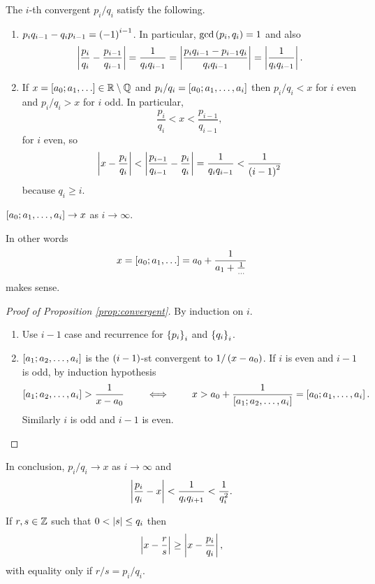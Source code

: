 \begin{proposition}
\label{prop:convergent}
The $ i $-th convergent $ p_i / q_i $ satisfy the following.
\begin{enumerate}
\item $ p_iq_{i - 1} - q_ip_{i - 1} = \rb{-1}^{i - 1} $. In particular, $ \gcd\rb{p_i, q_i} = 1 $ and also
$$ \abs{\dfrac{p_i}{q_i} - \dfrac{p_{i - 1}}{q_{i - 1}}} = \dfrac{1}{q_iq_{i - 1}} = \abs{\dfrac{p_iq_{i - 1} - p_{i - 1}q_i}{q_iq_{i - 1}}} = \abs{\dfrac{1}{q_iq_{i - 1}}}. $$
\item If $ x = \sb{a_0; a_1, \dots} \in \R \setminus \Q $ and $ p_i / q_i = \sb{a_0; a_1, \dots, a_i} $ then $ p_i / q_i < x $ for $ i $ even and $ p_i / q_i > x $ for $ i $ odd. In particular,
$$ \dfrac{p_i}{q_i} < x < \dfrac{p_{i - 1}}{q_{i - 1}}, $$
for $ i $ even, so
$$ \abs{x - \dfrac{p_i}{q_i}} < \abs{\dfrac{p_{i - 1}}{q_{i - 1}} - \dfrac{p_i}{q_i}} = \dfrac{1}{q_iq_{i - 1}} < \dfrac{1}{\rb{i - 1}^2} $$
because $ q_i \ge i $.
\end{enumerate}
\end{proposition}

\pagebreak

\begin{corollary}
$ \sb{a_0; a_1, \dots, a_i} \to x $ as $ i \to \infty $.
\end{corollary}

In other words
$$ x = \sb{a_0; a_1, \dots} = a_0 + \dfrac{1}{a_1 + \tfrac{1}{\dots}} $$
makes sense.

\begin{proof}[Proof of Proposition \ref{prop:convergent}]
By induction on $ i $.
\begin{enumerate}
\item Use $ i - 1 $ case and recurrence for $ \cb{p_i}_i $ and $ \cb{q_i}_i $.
\item $ \sb{a_1; a_2, \dots, a_i} $ is the $ \rb{i - 1} $-st convergent to $ 1 / \rb{x - a_0} $. If $ i $ is even and $ i - 1 $ is odd, by induction hypothesis
$$ \sb{a_1; a_2, \dots, a_i} > \dfrac{1}{x - a_0} \qquad \iff \qquad x > a_0 + \dfrac{1}{\sb{a_1; a_2, \dots, a_i}} = \sb{a_0; a_1, \dots, a_i}. $$
Similarly $ i $ is odd and $ i - 1 $ is even.
\end{enumerate}
\end{proof}

In conclusion, $ p_i / q_i \to x $ as $ i \to \infty $ and
$$ \abs{\dfrac{p_i}{q_i} - x} < \dfrac{1}{q_iq_{i + 1}} < \dfrac{1}{q_i^2}. $$

\begin{theorem}
If $ r, s \in \Z $ such that $ 0 < \abs{s} \le q_i $ then
$$ \abs{x - \dfrac{r}{s}} \ge \abs{x - \dfrac{p_i}{q_i}}, $$
with equality only if $ r / s = p_i / q_i $.
\end{theorem}


